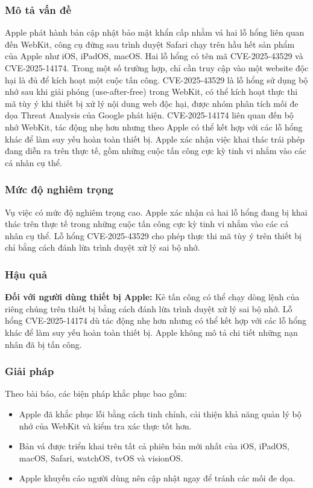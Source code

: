 \subsubsection{Mô tả vấn đề}
Apple phát hành bản cập nhật bảo mật khẩn cấp nhằm vá hai lỗ hổng liên quan đến WebKit, công cụ đứng sau trình duyệt Safari chạy trên hầu hết sản phẩm của Apple như iOS, iPadOS, macOS. Hai lỗ hổng có tên mã CVE-2025-43529 và CVE-2025-14174. Trong một số trường hợp, chỉ cần truy cập vào một website độc hại là đủ để kích hoạt một cuộc tấn công. CVE-2025-43529 là lỗ hổng sử dụng bộ nhớ sau khi giải phóng (use-after-free) trong WebKit, có thể kích hoạt thực thi mã tùy ý khi thiết bị xử lý nội dung web độc hại, được nhóm phân tích mối đe dọa Threat Analysis của Google phát hiện. CVE-2025-14174 liên quan đến bộ nhớ WebKit, tác động nhẹ hơn nhưng theo Apple có thể kết hợp với các lỗ hổng khác để làm suy yếu hoàn toàn thiết bị. Apple xác nhận việc khai thác trái phép đang diễn ra trên thực tế, gồm những cuộc tấn công cực kỳ tinh vi nhắm vào các cá nhân cụ thể.

\subsubsection{Mức độ nghiêm trọng}
Vụ việc có mức độ nghiêm trọng cao. Apple xác nhận cả hai lỗ hổng đang bị khai thác trên thực tế trong những cuộc tấn công cực kỳ tinh vi nhắm vào các cá nhân cụ thể. Lỗ hổng CVE-2025-43529 cho phép thực thi mã tùy ý trên thiết bị chỉ bằng cách đánh lừa trình duyệt xử lý sai bộ nhớ.

\subsubsection{Hậu quả}
\textbf{Đối với người dùng thiết bị Apple:} Kẻ tấn công có thể chạy dòng lệnh của riêng chúng trên thiết bị bằng cách đánh lừa trình duyệt xử lý sai bộ nhớ. Lỗ hổng CVE-2025-14174 dù tác động nhẹ hơn nhưng có thể kết hợp với các lỗ hổng khác để làm suy yếu hoàn toàn thiết bị. Apple không mô tả chi tiết những nạn nhân đã bị tấn công.

\subsubsection{Giải pháp}
Theo bài báo, các biện pháp khắc phục bao gồm:

\begin{itemize}
    \item Apple đã khắc phục lỗi bằng cách tinh chỉnh, cải thiện khả năng quản lý bộ nhớ của WebKit và kiểm tra xác thực tốt hơn.
    \item Bản vá được triển khai trên tất cả phiên bản mới nhất của iOS, iPadOS, macOS, Safari, watchOS, tvOS và visionOS.
    \item Apple khuyến cáo người dùng nên cập nhật ngay để tránh các mối đe dọa.
\end{itemize}

